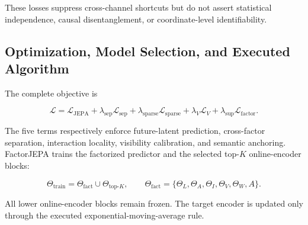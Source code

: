 These losses suppress cross-channel shortcuts but do not assert
statistical independence, causal disentanglement, or coordinate-level
identifiability.


\subsection{Optimization, Model Selection, and Executed Algorithm}
\label{app:training_algorithm}

The complete objective is

\[
\mathcal L
=
\mathcal L_{\mathrm{JEPA}}
+
\lambda_{\mathrm{sep}}\mathcal L_{\mathrm{sep}}
+
\lambda_{\mathrm{sparse}}\mathcal L_{\mathrm{sparse}}
+
\lambda_V\mathcal L_V
+
\lambda_{\mathrm{sup}}\mathcal L_{\mathrm{factor}}.
\]

The five terms respectively enforce future-latent prediction,
cross-factor separation, interaction locality, visibility calibration,
and semantic anchoring. FactorJEPA trains the factorized predictor and
the selected top-\(K\) online-encoder blocks:

\[
\Theta_{\mathrm{train}}
=
\Theta_{\mathrm{fact}}
\cup
\Theta_{\mathrm{top}\text{-}K},
\qquad
\Theta_{\mathrm{fact}}
=
\{
\Theta_L,\Theta_A,\Theta_I,\Theta_V,\Theta_W,A
\}.
\]

All lower online-encoder blocks remain frozen. The target encoder is
updated only through the executed exponential-moving-average rule.


\label{alg:factorjepa_training}

